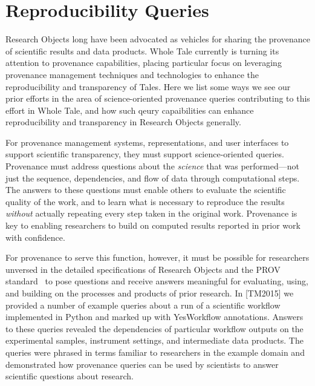 \section{Reproducibility Queries}\label{sec-transparency}

Research Objects long have been advocated as vehicles for sharing the 
	provenance of scientific results and data products.
Whole Tale currently is turning its attention to provenance capabilities, placing particular
	focus on leveraging provenance management techniques and technologies
	to enhance the reproducibility and transparency of Tales.
Here we list some ways we see our prior efforts in the area
	of science-oriented provenance queries contributing to this effort in Whole Tale,
	and how such qeury capaibilities can enhance reproducibility and transparency in 
	Research Objects generally.

For provenance management systems, representations, and user interfaces to support 
	scientific transparency, they must support science-oriented queries.
Provenance must address questions about the \emph{science} that was performed---not just the
	sequence, dependencies, and flow of data through computational steps.
The answers to these questions must enable others to evaluate the scientific quality of the work, 
	and to learn what is necessary to
	reproduce the results \emph{without} actually repeating every step taken in the original work.
Provenance is key to enabling researchers to build on computed results reported in prior work with confidence.

For provenance to serve this function, however, it must be possible for researchers unversed in the detailed
	specifications of Research Objects and the PROV standard~\cite{groth2013provoverviewa} to pose 
	questions and receive answers meaningful for evaluating, using, and building on the
	processes and products of prior research. 
In [TM2015] we provided a number of example queries about a run of a scientific
	workflow implemented in Python and marked up with YesWorkflow annotations.
Answers to these queries revealed the dependencies of particular workflow outputs
	on the experimental samples, instrument settings, and intermediate data products.
The queries were phrased in terms familiar to researchers  in the example domain
	and demonstrated how provenance queries can be used by scientists
	to answer scientific questions about research.

